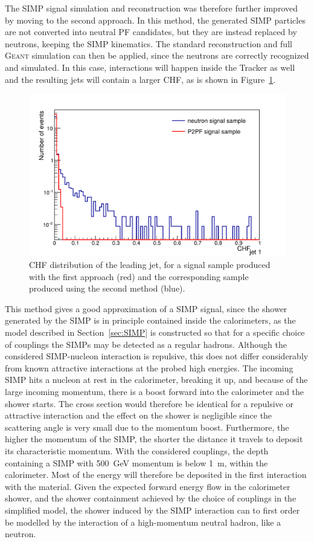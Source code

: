 The \ac{SIMP} signal simulation and reconstruction was therefore further improved by moving to the second approach. In this method, the generated \ac{SIMP} particles are not converted into neutral \ac{PF} candidates, but they are instead replaced by neutrons, keeping the \ac{SIMP} kinematics. The standard reconstruction and full \textsc{Geant} simulation can then be applied, since the neutrons are correctly recognized and simulated. In this case, interactions will happen inside the Tracker as well and the resulting jets will contain a larger CHF, as is shown in Figure~\ref{fig:neutron_chf}.

\begin{figure}[ht]
  \centering
 \includegraphics[width=.75\textwidth]{ChF_neutrons.pdf} 
 \caption{CHF distribution of the leading jet, for a signal sample produced with the first approach (red) and the corresponding sample produced using the second method (blue).}
 \label{fig:neutron_chf}
\end{figure}

This method gives a good approximation of a \ac{SIMP} signal, since the shower generated by the \ac{SIMP} is in principle contained inside the calorimeters, as the model described in Section~\ref{sec:SIMP} is constructed so that for a specific choice of couplings the \acp{SIMP} may be detected as a regular hadrons. Although the considered \ac{SIMP}-nucleon interaction is repulsive, this does not differ considerably from known attractive interactions at the probed high energies. The incoming \ac{SIMP} hits a nucleon at rest in the calorimeter, breaking it up, and because of the large incoming momentum, there is a boost forward into the calorimeter and the shower starts. The cross section would therefore be identical for a repulsive or attractive interaction and the effect on the shower is negligible since the scattering angle is very small due to the momentum boost. Furthermore, the higher the momentum of the \ac{SIMP}, the shorter the distance it travels to deposit its characteristic momentum. With the considered couplings, the depth containing a \ac{SIMP} with \SI{500}{GeV} momentum is below \SI{1}{m}, within the calorimeter. Most of the energy will therefore be deposited in the first interaction with the material. Given the expected forward energy flow in the calorimeter shower, and the shower containment achieved by the choice of couplings in the simplified model, the shower induced by the \ac{SIMP} interaction can to first order be modelled by the interaction of a high-momentum neutral hadron, like a neutron.

\clearpage
\clearpage{\pagestyle{empty}\cleardoublepage}
